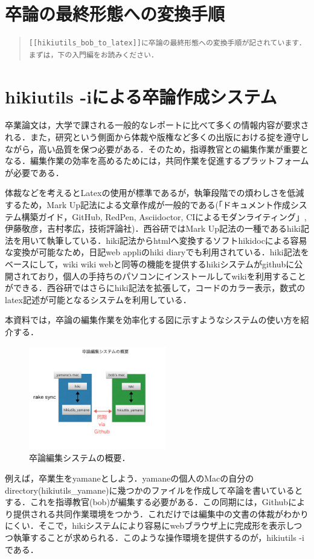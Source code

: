 \documentclass[12pt,a4paper]{jsarticle}
\begin{document}
\tableofcontents
\section{卒論の最終形態への変換手順}\begin{quote}\begin{verbatim}
[[hikiutils_bob_to_latex]]に卒論の最終形態への変換手順が記されています．まずは，下の入門編をお読みください．
\end{verbatim}\end{quote}
\section{hikiutils -iによる卒論作成システム}
卒業論文は，大学で課される一般的なレポートに比べて多くの情報内容が要求される．また，研究という側面から体裁や版権など多くの出版における掟を遵守しながら，高い品質を保つ必要がある．そのため，指導教官との編集作業が重要となる．編集作業の効率を高めるためには，共同作業を促進するプラットフォームが必要である．

体裁などを考えるとLatexの使用が標準であるが，執筆段階での煩わしさを低減するため，Mark Up記法による文章作成が一般的である(「ドキュメント作成システム構築ガイド，GitHub, RedPen, Asciidoctor, CIによるモダンライティング」, 伊藤敬彦，吉村孝広，技術評論社)．西谷研ではMark Up記法の一種であるhiki記法を用いて執筆している．hiki記法からhtmlへ変換するソフトhikidocによる容易な変換が可能なため，日記web appliのhiki diaryでも利用されている．hiki記法をベースにして，wiki wiki webと同等の機能を提供するhikiシステムがgithubに公開されており，個人の手持ちのパソコンにインストールしてwikiを利用することができる．西谷研ではさらにhiki記法を拡張して，コードのカラー表示，数式のlatex記述が可能となるシステムを利用している．

本資料では，卒論の編集作業を効率化する図に示すようなシステムの使い方を紹介する．

\begin{figure}[htbp]\begin{center}
\includegraphics[width=6cm,bb=0 0 442 500]{./hikiutils_bob.002.jpeg}
\caption{卒論編集システムの概要．}
\label{default}\end{center}\end{figure}
例えば，卒業生をyamaneとしよう．yamaneの個人のMacの自分のdirectory(hikiutils\_yamane)に幾つかのファイルを作成して卒論を書いているとする．これを指導教官(bob)が編集する必要がある．この同期には，Githubにより提供される共同作業環境をつかう．これだけでは編集中の文書の体裁がわかりにくい．そこで，hikiシステムにより容易にwebブラウザ上に完成形を表示しつつ執筆することが求められる．このような操作環境を提供するのが，hikiutils -iである．
\end{document}
